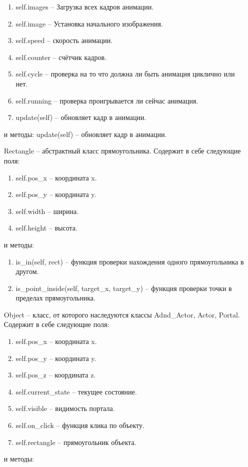 \begin{enumerate}
\begin{enumerate}
		\item self.images  -- Загрузка всех кадров анимации.
		\item self.image -- Установка начального изображения.
		\item self.speed -- скорость анимации.
		\item self.counter -- счётчик кадров.
		\item self.cycle -- проверка на то что должна ли быть анимация циклично или нет.
		\item self.running -- проверка проигрывается ли сейчас анимация.
		\item update(self) -- обновляет кадр в анимации.
	\end{enumerate}
	и методы:
		update(self) -- обновляет кадр в анимации.
	\item[Rectangle] -- абстрактный класс прямоугольника. Содержит в себе следующие поля:
	\begin{enumerate}
		\item self.pos\_x -- координата x.
		\item self.pos\_y -- координата y.
		\item self.width -- ширина.
		\item self.height -- высота.
	\end{enumerate}
	и методы:
	\begin{enumerate}
		\item is\_in(self, rect) -- функция проверки нахождения одного прямоугольника в другом.
		\item is\_point\_inside(self, target\_x, target\_y) -- функция проверки точки в пределах прямоугольника.
	\end{enumerate}
	\item[Object] -- класс, от которого наследуются классы Adnd\_Actor, Actor, Portal. Содержит в себе следующие поля:
	\begin{enumerate}
		\item self.pos\_x -- координата x.
		\item self.pos\_y -- координата y.
		\item self.pos\_z -- координата z.
		\item self.current\_state -- текущее состояние.
		\item self.visible -- видимость портала.
		\item self.on\_click -- функция клика по объекту.
		\item self.rectangle -- прямоугольник объекта.
	\end{enumerate}
	и методы:
	\begin{enumerate}

\end{enumerate}
\end{enumerate}
